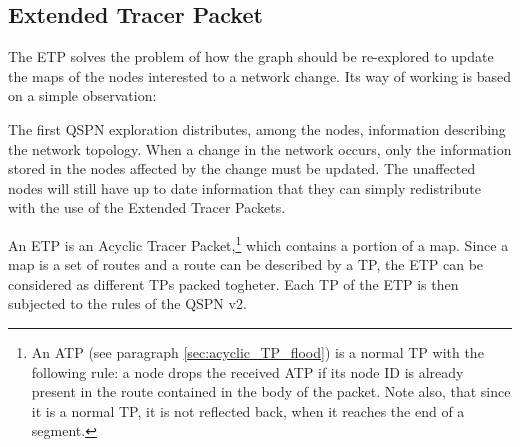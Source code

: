 \documentclass[a4paper]{article}
\begin{document}
%

\subsection{Extended Tracer Packet}
\label{sec:etp}
The ETP solves the problem of how the graph should be re-explored to
update the maps of the nodes interested to a network change.
Its way of working is based on a simple observation:

The first QSPN exploration distributes, among the nodes, information describing
the network topology. 
When a change in the network occurs, only
the information stored in the nodes affected by the change must be updated.
The unaffected nodes will still have up to date information that they can simply
redistribute with the use of the Extended Tracer Packets.

An ETP is an Acyclic Tracer Packet,\footnote{
An ATP (see paragraph \ref{sec:acyclic_TP_flood}) is a normal TP with the following
rule: a node drops the received ATP if  its  node ID is already present in the route
contained in the body of the packet. Note also, that since it is a normal TP,
it is not reflected back, when it reaches the end of a segment.}
which contains a portion of a map. Since a map is a set of routes and a
route can be described by a TP, the ETP can be considered as different TPs packed togheter.
Each TP of the ETP is then subjected to the rules of the QSPN v2.
\end{document}
